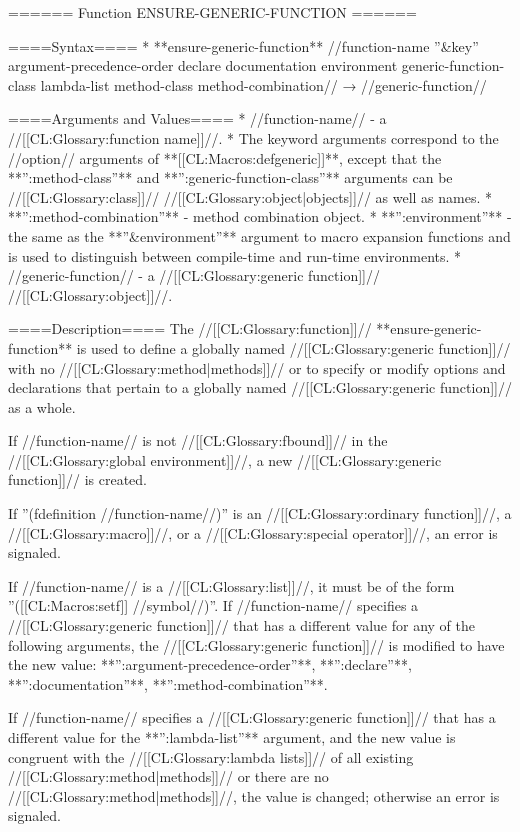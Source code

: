 ====== Function ENSURE-GENERIC-FUNCTION ======

====Syntax====
  * **ensure-generic-function** //function-name ''&key'' argument-precedence-order declare documentation environment generic-function-class lambda-list method-class method-combination// → //generic-function//

====Arguments and Values====
  * //function-name// - a //[[CL:Glossary:function name]]//.
    * The keyword arguments correspond to the //option// arguments of **[[CL:Macros:defgeneric]]**, except that the **'':method-class''** and **'':generic-function-class''** arguments can be //[[CL:Glossary:class]]// //[[CL:Glossary:object|objects]]// as well as names.
    * **'':method-combination''** - method combination object.
    * **'':environment''** - the same as the **''&environment''** argument to macro expansion functions and is used to distinguish between compile-time and run-time environments.
  * //generic-function// - a //[[CL:Glossary:generic function]]// //[[CL:Glossary:object]]//.

====Description====
The //[[CL:Glossary:function]]// **ensure-generic-function** is used to define a globally named //[[CL:Glossary:generic function]]// with no //[[CL:Glossary:method|methods]]// or to specify or modify options and declarations that pertain to a globally named //[[CL:Glossary:generic function]]// as a whole.

If //function-name// is not //[[CL:Glossary:fbound]]// in the //[[CL:Glossary:global environment]]//, a new //[[CL:Glossary:generic function]]// is created.

If ''(fdefinition //function-name//)'' is an //[[CL:Glossary:ordinary function]]//, a //[[CL:Glossary:macro]]//, or a //[[CL:Glossary:special operator]]//, an error is signaled.

If //function-name// is a //[[CL:Glossary:list]]//, it must be of the form ''([[CL:Macros:setf]] //symbol//)''. If //function-name// specifies a //[[CL:Glossary:generic function]]// that has a different value for any of the following arguments, the //[[CL:Glossary:generic function]]// is modified to have the new value: **'':argument-precedence-order''**, **'':declare''**, **'':documentation''**, **'':method-combination''**.

If //function-name// specifies a //[[CL:Glossary:generic function]]// that has a different value for the **'':lambda-list''** argument, and the new value is congruent with the //[[CL:Glossary:lambda lists]]// of all existing //[[CL:Glossary:method|methods]]// or there are no //[[CL:Glossary:method|methods]]//, the value is changed; otherwise an error is signaled.

